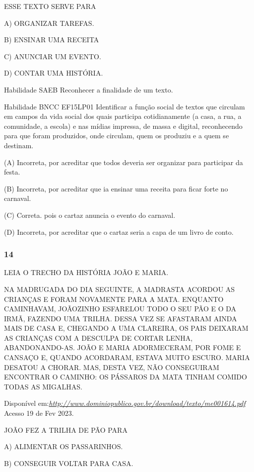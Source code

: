 \protect\hypertarget{_heading=h.2u6wntf}{}{}ESSE TEXTO SERVE PARA

A) ORGANIZAR TAREFAS.

B) ENSINAR UMA RECEITA

C) ANUNCIAR UM EVENTO.

D) CONTAR UMA HISTÓRIA.

Habilidade SAEB Reconhecer a finalidade de um texto.

Habilidade BNCC EF15LP01 Identificar a função social de textos que
circulam em campos da vida social dos quais participa cotidianamente (a
casa, a rua, a comunidade, a escola) e nas mídias impressa, de massa e
digital, reconhecendo para que foram produzidos, onde circulam, quem os
produziu e a quem se destinam.

(A) Incorreta, por acreditar que todos deveria ser organizar para
participar da festa.

(B) Incorreta, por acreditar que ia ensinar uma receita para ficar
forte no carnaval.

(C) Correta. pois o cartaz anuncia o evento do carnaval.

(D) Incorreta, por acreditar que o cartaz seria a capa de um livro de
conto.\protect\hypertarget{_heading=h.gluii2ldfhnb}{}{}

\subsubsection{14}\label{section-39}

LEIA O TRECHO DA HISTÓRIA JOÃO E MARIA.

NA MADRUGADA DO DIA SEGUINTE, A MADRASTA ACORDOU AS CRIANÇAS E FORAM
NOVAMENTE PARA A MATA. ENQUANTO CAMINHAVAM, JOÃOZINHO ESFARELOU TODO O
SEU PÃO E O DA IRMÃ, FAZENDO UMA TRILHA. DESSA VEZ SE AFASTARAM AINDA
MAIS DE CASA E, CHEGANDO A UMA CLAREIRA, OS PAIS DEIXARAM AS CRIANÇAS
COM A DESCULPA DE CORTAR LENHA, ABANDONANDO-AS. JOÃO E MARIA
ADORMECERAM, POR FOME E CANSAÇO E, QUANDO ACORDARAM, ESTAVA MUITO
ESCURO. MARIA DESATOU A CHORAR. MAS, DESTA VEZ, NÃO CONSEGUIRAM
ENCONTRAR O CAMINHO: OS PÁSSAROS DA MATA TINHAM COMIDO TODAS AS
MIGALHAS.

Disponível
em:\href{http://www.dominiopublico.gov.br/download/texto/me001614.pdf}{\emph{http://www.dominiopublico.gov.br/download/texto/me001614.pdf}}
Acesso 19 de Fev 2023.

JOÃO FEZ A TRILHA DE PÃO PARA

A) ALIMENTAR OS PASSARINHOS.

B) CONSEGUIR VOLTAR PARA CASA.

